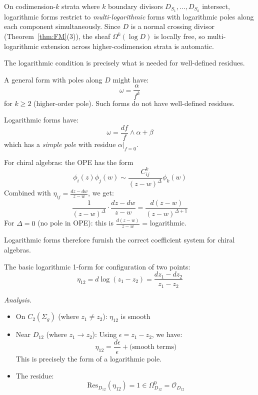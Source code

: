 \begin{remark}\label{rem:multi-log-codim2}
On codimension-$k$ strata where $k$ boundary divisors
$D_{S_1}, \ldots, D_{S_k}$ intersect, logarithmic forms
restrict to \emph{multi-logarithmic} forms with logarithmic
poles along each component simultaneously.
Since $D$ is a normal crossing divisor
(Theorem~\ref{thm:FM}(3)), the sheaf
$\Omega^k(\log D)$ is locally free, so multi-logarithmic
extension across higher-codimension strata is automatic.
\end{remark}

\begin{remark}\label{rem:why-log}
The logarithmic condition is precisely what is needed for well-defined residues.

A general form with poles along $D$ might have:
\[\omega = \frac{\alpha}{f^k}\]
for $k \geq 2$ (higher-order pole). Such forms do not have well-defined residues.

Logarithmic forms have:
\[\omega = \frac{df}{f} \wedge \alpha + \beta\]
which has a \emph{simple pole} with residue $\alpha|_{f=0}$.

For chiral algebras: the OPE has the form
\[\phi_i(z)\phi_j(w) \sim \frac{C_{ij}^k}{(z-w)^\Delta} \phi_k(w)\]
Combined with $\eta_{ij} = \frac{dz-dw}{z-w}$, we get:
\[\frac{1}{(z-w)^\Delta} \cdot \frac{dz-dw}{z-w} = \frac{d(z-w)}{(z-w)^{\Delta+1}}\]
For $\Delta = 0$ (no pole in OPE): this is $\frac{d(z-w)}{z-w}$ = logarithmic.

Logarithmic forms therefore furnish the correct coefficient system for chiral algebras.
\end{remark}

\begin{example}\label{ex:log-form-two-points}
The basic logarithmic 1-form for configuration of two points:
\[\eta_{12} = d\log(z_1 - z_2) = \frac{dz_1 - dz_2}{z_1 - z_2}\]

\emph{Analysis.}
\begin{itemize}
\item On $C_2(\Sigma_g)$ (where $z_1 \neq z_2$): $\eta_{12}$ is smooth
\item Near $D_{12}$ (where $z_1 \to z_2$): Using $\epsilon = z_1 - z_2$, we have:
\[\eta_{12} = \frac{d\epsilon}{\epsilon} + \text{(smooth terms)}\]
This is precisely the form of a logarithmic pole.
\item The residue:
\[\text{Res}_{D_{12}}(\eta_{12}) = 1 \in \Omega^0_{D_{12}} = \mathcal{O}_{D_{12}}\]
\end{itemize}
\end{example}


